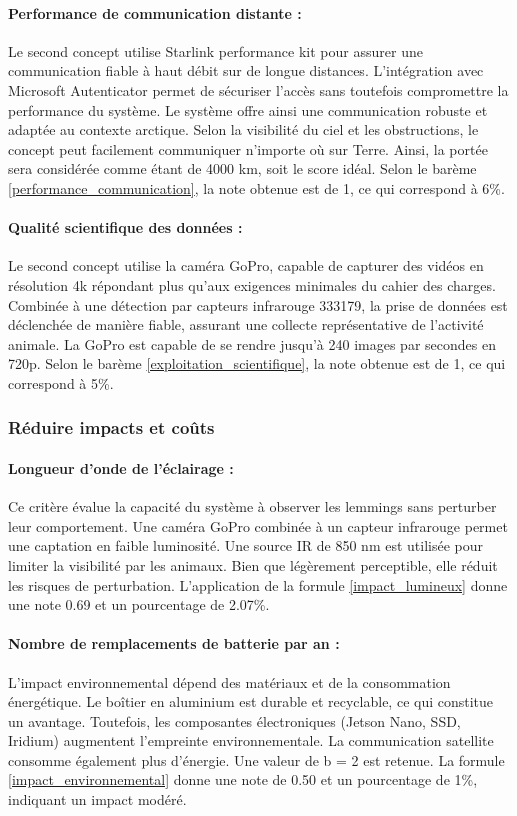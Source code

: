 \paragraph{Performance de communication distante :}
Le second concept utilise Starlink performance kit pour assurer une communication fiable à haut débit sur de longue distances.
L’intégration avec Microsoft Autenticator permet de sécuriser l’accès sans toutefois compromettre la performance du système. 
Le système offre ainsi une communication robuste et adaptée au contexte arctique.
Selon la visibilité du ciel et les obstructions, le concept peut facilement communiquer n'importe où sur Terre.
Ainsi, la portée sera considérée comme étant de 4000 km, soit le score idéal.
Selon le barème \ref{performance_communication}, la note obtenue est de 1, ce qui correspond à 6\%.

\paragraph{Qualité scientifique des données :}
Le second concept utilise la caméra GoPro, capable de capturer des vidéos en résolution 4k répondant plus qu’aux exigences minimales du cahier des charges.
Combinée à une détection par capteurs infrarouge 333179, la prise de données est déclenchée de manière fiable, assurant une collecte représentative de l’activité animale.
La GoPro est capable de se rendre jusqu'à 240 images par secondes en 720p.
Selon le barème \ref{exploitation_scientifique}, la note obtenue est de 1, ce qui correspond à 5\%.


\subsubsection{Réduire impacts et coûts}

\paragraph{Longueur d'onde de l'éclairage :}
Ce critère évalue la capacité du système à observer les lemmings sans perturber leur comportement.
Une caméra GoPro combinée à un capteur infrarouge permet une captation en faible luminosité.
Une source IR de 850 nm est utilisée pour limiter la visibilité par les animaux.
Bien que légèrement perceptible, elle réduit les risques de perturbation.
L’application de la formule \ref{impact_lumineux} donne une note 0.69 et un pourcentage de 2.07\%.

\paragraph{Nombre de remplacements de batterie par an :}
L’impact environnemental dépend des matériaux et de la consommation énergétique.
Le boîtier en aluminium est durable et recyclable, ce qui constitue un avantage.
Toutefois, les composantes électroniques (Jetson Nano, SSD, Iridium) augmentent l’empreinte environnementale.
La communication satellite consomme également plus d’énergie.
Une valeur de b = 2 est retenue.
La formule \ref{impact_environnemental} donne une note de 0.50 et un pourcentage de 1\%, indiquant un impact modéré. 

